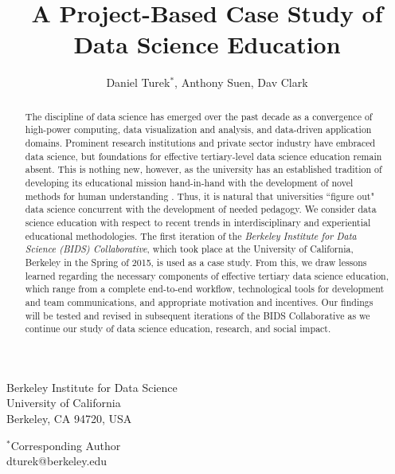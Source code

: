 \documentclass[12pt]{article}
\begin{document}
\title{A Project-Based Case Study of Data Science Education}

\author{Daniel Turek$^{*}$, Anthony Suen, Dav Clark}

\date{}

\maketitle

\vspace{0.4in}
\begin{center}

Berkeley Institute for Data Science \\
University of California \\
Berkeley, CA 94720, USA

\vspace{0.8in}

$^*$Corresponding Author \\
dturek@berkeley.edu
\end{center}

\thispagestyle{empty}
\newpage

\begin{abstract}
The discipline of data science has emerged over the past decade as a convergence of high-power computing, data visualization and analysis, and data-driven application domains.  Prominent research institutions and private sector industry have embraced data science, but foundations for effective tertiary-level data science education remain absent. This is nothing new, however, as the university has an established tradition of developing its educational mission hand-in-hand with the development of novel methods for human understanding \citep{feingold_tradition_1991}. Thus, it is natural that universities ``figure out" data science concurrent with the development of needed pedagogy. We consider data science education with respect to recent trends in interdisciplinary and experiential educational methodologies. The first iteration of the \emph{Berkeley Institute for Data Science (BIDS) Collaborative}, which took place at the University of California, Berkeley in the Spring of 2015, is used as a case study. From this, we draw lessons learned regarding the necessary components of effective tertiary data science education, which range from a complete end-to-end workflow, technological tools for development and team communications, and appropriate motivation and incentives. Our findings will be tested and revised in subsequent iterations of the BIDS Collaborative as we continue our study of data science education, research, and social impact.
\end{abstract}
\end{document}
